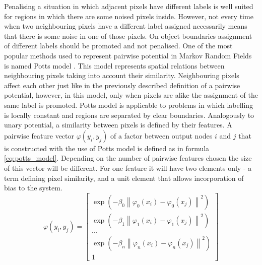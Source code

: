 Penalising a situation in which adjacent pixels have different labels is well suited for regions in which there are some noised pixels inside. However, not every time when two neighbouring pixels have a different label assigned necessarily means that there is some noise in one of those pixels. On object boundaries assignment of different labels should be promoted and not penalised. One of the most popular methods used to represent pairwise potential in Markov Random Fields is named Potts model \cite{potts_model}. This model represents spatial relations between neighbouring pixels taking into account their similarity. Neighbouring pixels affect each other just like in the previously described definition of a pairwise potential, however, in this model, only when pixels are alike the assignment of the same label is promoted. Potts model is applicable to problems in which labelling is locally constant and regions are separated by clear boundaries. Analogously to unary potential, a similarity between pixels is defined by their features. A pairwise feature vector $\varphi(y_i,y_j)$ of a factor between output nodes $i$ and $j$ that is constructed with the use of Potts model is defined as in formula \ref{eq:potts_model}. Depending on the number of pairwise features chosen the size of this vector will be different. For one feature it will have two elements only - a term defining pixel similarity, and a unit element that allows incorporation of bias to the system.
\begin{equation}
    \label{eq:potts_model}
    \varphi(y_i,y_j) = \begin{bmatrix}
        \exp{(-\beta_0 \left \| \varphi_0(x_i) - \varphi_0(x_j)\right \|^2)} \\
        \exp{(-\beta_1 \left \| \varphi_1(x_i) - \varphi_1(x_j)\right \|^2)} \\
        ...             \\
        \exp{(-\beta_n \left \| \varphi_n(x_i) - \varphi_n(x_j)\right \|^2)} \\
        1
    \end{bmatrix}
\end{equation}


